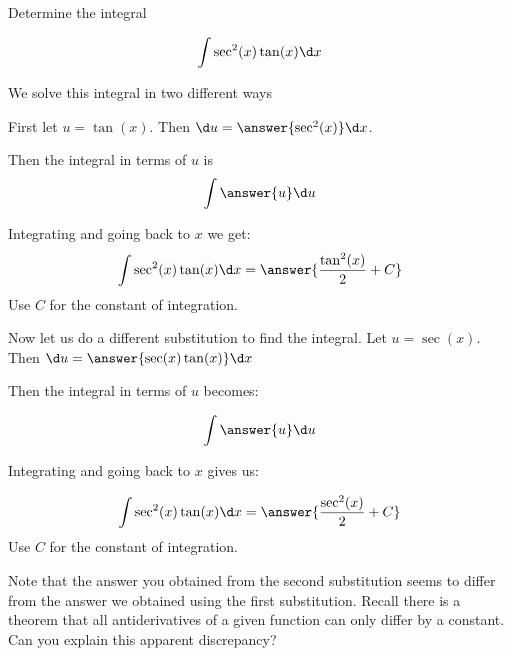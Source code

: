 \documentclass{ximera}
\author{Jason Miller}
\begin{document}
\begin{exercise}
Determine the integral

\[
\int \sec^{2}(x) \tan(x) \d x
\]

We solve this integral in two different ways


First let $u=\tan(x)$. Then $\d u=\answer{ \sec^{2}(x)} \d x$. 

Then the integral in terms of $u$ is
\[
\int \answer{u} \d u
\]

Integrating and going back to $x$ we get:
\[
\int \sec^{2}(x)\tan(x) \d x= \answer{  \frac{ \tan^{2}(x)}{2}  + C}
\]
Use $C$ for the constant of integration. 

\begin{exercise}

Now let us do a different substitution to find the integral. Let $u=\sec(x)$. Then $\d u=\answer{ \sec(x) \tan(x)} \d x$

Then the integral in terms of $u$ becomes:

\[
\int \answer{u} \d u 
\]

Integrating and going back to $x$ gives us:

\[
\int \sec^{2}(x) \tan(x) \d x= \answer{  \frac{ \sec^{2}(x) }{2}+ C}
\]
Use $C$ for the constant of integration. 

Note that the answer you obtained from the second substitution seems to differ from the answer we obtained using the first substitution. Recall there is a theorem that all antiderivatives 
of a given function can only differ by a constant. Can you explain this apparent discrepancy?
\end{exercise}



\end{exercise}
\end{document}

